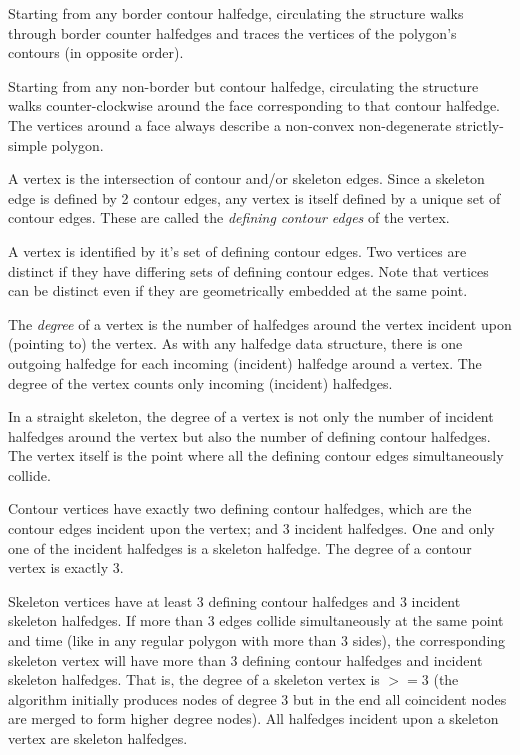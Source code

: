 Starting from any border contour halfedge, circulating the structure
walks through border counter halfedges and traces the vertices of the
polygon's contours (in opposite order).

Starting from any non-border but contour halfedge, circulating the
structure walks counter-clockwise around the face corresponding
to that contour halfedge. The vertices around a face always describe
a non-convex non-degenerate strictly-simple polygon.

A vertex is the intersection of contour and/or skeleton edges. Since a
skeleton edge is defined by 2 contour edges, any vertex is itself
defined by a unique set of contour edges. These are called the
{\em defining contour edges} of the vertex.

A vertex is identified by it's set of defining contour edges. Two
vertices are distinct if they have differing sets of defining contour
edges.  Note that vertices can be distinct even if they are geometrically
embedded at the same point.

The {\em degree} of a vertex is the number of halfedges around the vertex 
incident upon (pointing to) the vertex. As with any halfedge data structure,
there is one outgoing halfedge for each incoming (incident) halfedge around
a vertex. The degree of the vertex counts only incoming (incident) halfedges.

In a straight skeleton, the degree of a vertex is not only the number of
incident halfedges around the vertex but also the number of defining contour
halfedges. The vertex itself is the point where all the defining
contour edges simultaneously collide.

Contour vertices have exactly two defining contour halfedges, which are
the contour edges incident upon the vertex; and 3 incident halfedges.
One and only one of the incident halfedges is a skeleton halfedge.
The degree of a contour vertex is exactly 3.

Skeleton vertices have at least 3 defining contour halfedges and 3 incident skeleton halfedges.
If more than 3 edges collide simultaneously at the same point and time (like in any regular polygon
with more than 3 sides), the corresponding skeleton vertex will have more than 3 defining contour
halfedges and incident skeleton halfedges. That is, the degree of a skeleton vertex is $>=3$ 
(the algorithm initially produces nodes of degree 3 but in the end all coincident nodes are merged to form higher degree nodes). All halfedges incident upon a skeleton vertex are skeleton halfedges.

